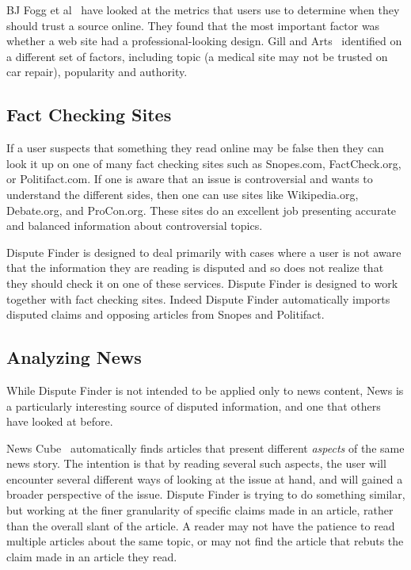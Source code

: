 \documentclass{www2010-submission}
\newcommand{\todo}[1]{}
\begin{document}
BJ Fogg et al~\cite{Fogg2000, Fogg2003} have looked at the metrics that users use to determine when they should trust a source online. They found that the most important factor was whether a web site had a professional-looking design. Gill and Arts~\cite{Gil2006} identified on a different set of factors, including topic (a medical site may not be trusted on car repair), popularity and authority.

\todo{Talk about how this information was used in the design of Dispute Finder.}


\subsection{Fact Checking Sites}

If a user suspects that something they read online may be false then they can look it up on one of many fact checking sites such as Snopes.com, FactCheck.org, or Politifact.com. If one is aware that an issue is controversial and wants to understand the different sides, then one can use sites like Wikipedia.org, Debate.org, and ProCon.org. These sites do an excellent job presenting accurate and balanced information about controversial topics. 

Dispute Finder is designed to deal primarily with cases where a user is not aware that the information they are reading is disputed and so does not realize that they should check it on one of these services. Dispute Finder is designed to work together with fact checking sites. Indeed Dispute Finder automatically imports disputed claims and opposing articles from Snopes and Politifact.

\subsection{Analyzing News}

While Dispute Finder is not intended to be applied only to news content, News is a particularly interesting source of disputed information, and one that others have looked at before. 

News Cube~\cite{Park2009} automatically finds articles that present different {\it aspects} of the same news story. The intention is that by reading several such aspects, the user will encounter several different ways of looking at the issue at hand, and will gained a broader perspective of the issue. Dispute Finder is trying to do something similar, but working at the finer granularity of specific claims made in an article, rather than the overall slant of the article. A reader may not have the patience to read multiple articles about the same topic, or may not find the article that rebuts the claim made in an article they read. 
\end{document}
